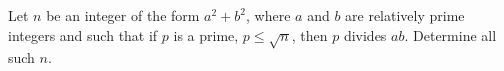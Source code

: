 Let $n$ be an integer of the form $a^2 + b^2$, where $a$ and $b$ are relatively prime integers and such that if $p$ is a prime, $p \leq \sqrt{n}$, then $p$ divides $ab$.  Determine all such $n$.